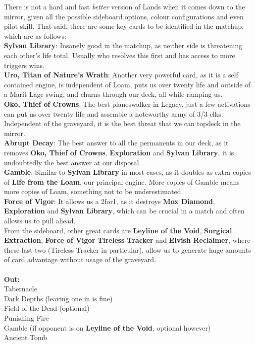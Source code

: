 \documentclass{report}
\begin{document}
There is not a hard and fast \emph{better} version of Lands when it comes down to the mirror, given all the possible sideboard options, colour configurations and even pilot skill. That said, there are some key cards to be identified in the matchup, which are as follows:\\
\textbf{Sylvan Library}: Insanely good in the matchup, as neither side is threatening each other's life total. Usually who resolves this first and has access to more triggers wins.\\
\textbf{Uro, Titan of Nature's Wrath}: Another very powerful card, as it is a self contained engine, is independent of Loam, puts us over twenty life and outside of a Marit Lage swing, and churns through our deck, all while ramping us.\\
\textbf{Oko, Thief of Crowns}: The best planeswalker in Legacy, just a few activations can put us over twenty life and assemble a noteworthy army of 3/3 elks. Independent of the graveyard, it is the best threat that we can topdeck in the mirror.\\
\textbf{Abrupt Decay}: The best answer to all the permanents in our deck, as it removes \textbf{Oko, Thief of Crowns}, \textbf{Exploration} and \textbf{Sylvan Library}, it is undoubtedly the best answer at our disposal.\\
\textbf{Gamble}: Similar to \textbf{Sylvan Library} in most cases, as it doubles as extra copies of \textbf{Life from the Loam}, our principal engine. More copies of Gamble means more copies of Loam, something not to be underestimated.\\
\textbf{Force of Vigor}: It allows us a 2for1, as it destroys \textbf{Mox Diamond}, \textbf{Exploration} and \textbf{Sylvan Library}, which can be crucial in a match and often allows us to pull ahead.\\
From the sideboard, other great cards are \textbf{Leyline of the Void}, \textbf{Surgical Extraction}, \textbf{Force of Vigor} \textbf{Tireless Tracker} and \textbf{Elvish Reclaimer}, where these last two (Tireless Tracker in particular), allow us to generate huge amounts of card advantage without usage of the graveyard.\\\\
\textbf{Out:}\\
Tabernacle\\Dark Depths (leaving one in is fine)\\Field of the Dead (optional)\\Punishing Fire\\Gamble (if opponent is on \textbf{Leyline of the Void}, optional however)\\Ancient Tomb\\\\
\end{document}
